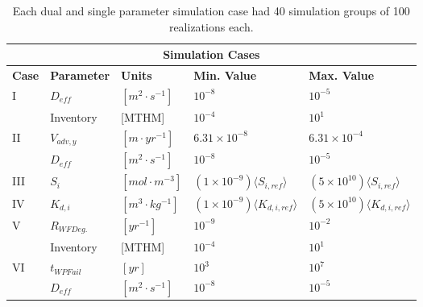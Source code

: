 \begin{table*}[ht!]
\centering
\footnotesize{
  \begin{tabularx}{175mm}{|l|X|X|X|X|}
\multicolumn{5}{c}{\textbf{Simulation Cases}}\\
\hline
\textbf{Case} & \textbf{Parameter} & \textbf{Units} & \textbf{Min. Value} & \textbf{Max. Value}\\
\hline
I     & $D_{eff}$    & $[m^2\cdot s^{-1}]$       & $10^{-8}$    &  $10^{-5}$ \\
      & Inventory              & [MTHM]         & $10^{-4}$    &  $10^1$ \\
\hline
II    & $V_{adv, y}$ & $[m \cdot yr^{-1}]$       & $6.31\times10^{-8}$  &  $6.31\times10^{-4}$ \\
      & $D_{eff}$    & $[m^2\cdot s^{-1}]$       & $10^{-8}$    &  $10^{-5}$ \\
\hline
III   & $S_i$        & $[mol\cdot m^{-3}]$       & $(1\times10^{-9})\langle S_{i,ref}\rangle $    &  $(5\times10^{10})\langle S_{i,ref}\rangle $ \\
\hline
IV    & $K_{d,i}$    & $[m^3\cdot kg^{-1}]$       & $(1\times10^{-9})\langle 
K_{d,i,ref}\rangle $    &  $(5\times10^{10})\langle K_{d,i,ref}\rangle $ \\
\hline
V     & $R_{WFDeg.}$           & $[yr^{-1}]$       & $10^{-9}$    &  $10^{-2}$ \\
      & Inventory              & [MTHM]         & $10^{-4}$    &  $10^1$ \\
\hline 
VI    & $t_{WPFail}$        & $[yr]$         & $10^3$    &  $10^7$ \\
      & $D_{eff}$           & $[m^2\cdot s^{-1}]$       & $10^{-8}$    &  $10^{-5}$ \\
\hline
\end{tabularx}
\label{tab:Cases}
\caption{Each dual and single parameter simulation case had 40 simulation 
groups of 100 realizations each.}
}
\end{table*}

